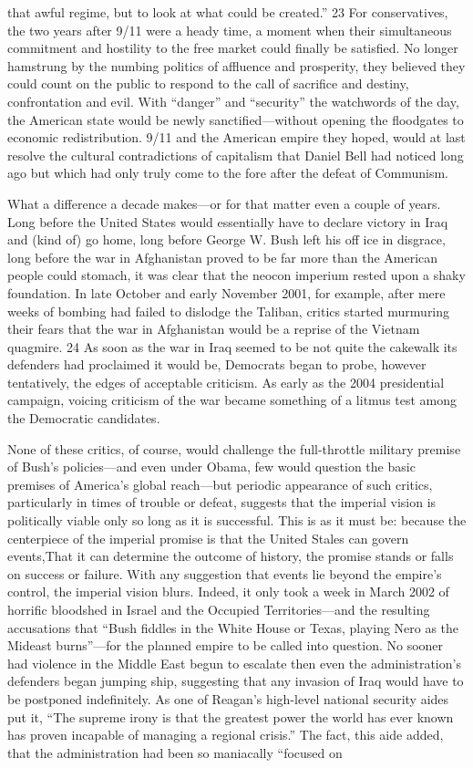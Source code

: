 that awful regime, but to look at what could be created.” {\color{blue} 23 } For conservatives, the two years after 9/11 were a heady time, a moment when their simultaneous commitment and hostility to the free market could finally be satisfied. No longer hamstrung by the numbing politics of affluence and prosperity, they believed they could count on the public to respond to the call of sacrifice and destiny, confrontation and evil. With “danger” and “security” the watchwords of the day, the American state would be newly sanctified—without opening the floodgates to economic redistribution. 9/11 and the American empire they hoped, would at last resolve the cultural contradictions of capitalism that Daniel Bell had noticed long ago but which had only truly come to the fore after the defeat of Communism.{\par} What a difference a decade makes—or for that matter even a couple of years. Long before the United States would essentially have to declare victory in Iraq and (kind of) go home, long before George W. Bush left his off ice in disgrace, long before the war in Afghanistan proved to be far more than the American people could stomach, it was clear that the neocon imperium rested upon a shaky foundation. In late October and early November 2001, for example, after mere weeks of bombing had failed to dislodge the Taliban, critics started murmuring their fears that the war in Afghanistan would be a reprise of the Vietnam quagmire. {\color{blue} 24 } As soon as the war in Iraq seemed to be not quite the cakewalk its defenders had proclaimed it would be, Democrats began to probe, however tentatively, the edges of acceptable criticism. As early as the 2004 presidential campaign, voicing criticism of the war became something of a litmus test among the Democratic candidates.{\par} None of these critics, of course, would challenge the full-throttle military premise of Bush’s policies—and even under Obama, few would question the basic premises of America’s global reach—but periodic appearance of such critics, particularly in times of trouble or defeat, suggests that the imperial vision is politically viable only so long as it is successful. This is as it must be: because the centerpiece of the imperial promise is that the United Stales can govern events,That it can determine the outcome of history, the promise stands or falls on success or failure. With any suggestion that events lie beyond the empire’s control, the imperial vision blurs. Indeed, it only took a week in March 2002 of horrific bloodshed in Israel and the Occupied Territories—and the resulting accusations that “Bush fiddles in the White House or Texas, playing Nero as the Mideast burns”—for the planned empire to be called into question. No sooner had violence in the Middle East begun to escalate then even the administration’s defenders began jumping ship, suggesting that any invasion of Iraq would have to be postponed indefinitely. As one of Reagan’s high-level national security aides put it, “The supreme irony is that the greatest power the world has ever known has proven incapable of managing a regional crisis.” The fact, this aide added, that the administration had been so maniacally “focused on 